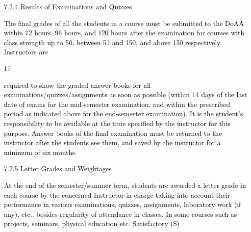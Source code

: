 \documentclass[12pt]{article}
\begin{document}
\vspace{\baselineskip}
{\fontsize{10pt}{12.0pt}\selectfont \textcolor[HTML]{00000A}{7.2.4 Results of Examinations and Quizzes}\par}\par


\vspace{\baselineskip}
{\fontsize{9pt}{10.8pt}\selectfont \textcolor[HTML]{00000A}{The final grades of all the students in a course must be submitted to the DoAA within 72 hours, 96 hours, and 120 hours after the examination for courses with class strength up to 50, between 51 and 150, and above 150 respectively. Instructors are}\par}\par


\vspace{\baselineskip}
\begin{Center}
\textcolor[HTML]{00000A}{17}
\end{Center}\par


\vspace{\baselineskip}
\begin{justify}
{\fontsize{10pt}{12.0pt}\selectfont \textcolor[HTML]{00000A}{required to show the graded answer books for all examinations/quizzes/assignments as soon as possible (within 14 days of the last date of exams for the mid-semester examination, and within the prescribed period as indicated above for the end-semester examination). It is the student's responsibility to be available at the time specified by the instructor for this purpose. Answer books of the final examination must be returned to the instructor after the students see them, and saved by the instructor for a minimum of six months.}\par}
\end{justify}\par


\vspace{\baselineskip}
{\fontsize{10pt}{12.0pt}\selectfont \textcolor[HTML]{00000A}{7.2.5 Letter Grades and Weightages}\par}\par


\vspace{\baselineskip}
\begin{justify}
{\fontsize{9pt}{10.8pt}\selectfont \textcolor[HTML]{00000A}{At the end of the semester/summer term, students are awarded a letter grade in each course by the concerned Instructor-in-charge taking into account their performance in various examinations, quizzes, assignments, laboratory work (if any), etc., besides regularity of attendance in classes. In some courses such as projects, seminars, physical education etc. Satisfactory (S)}\par}
\end{justify}\par
\end{document}
